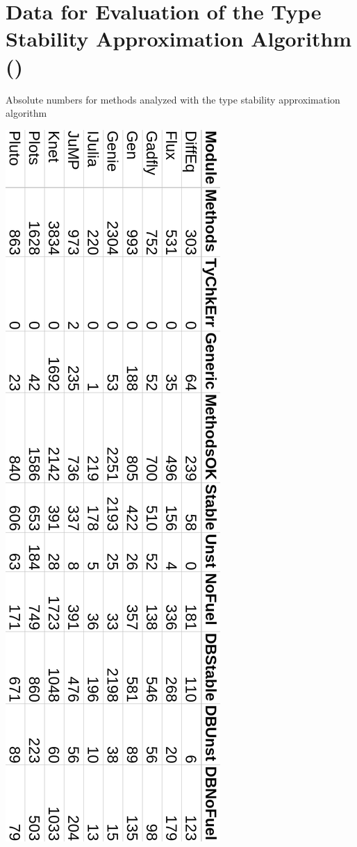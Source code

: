 \chapter[Data for Evaluation of the Type Stability Approximation Algorithm]{%
  Data for Evaluation of the Type Stability Approximation Algorithm ()}%
\label{app:approx}

\begin{table}%
\caption{Absolute numbers for methods analyzed with the type stability
  approximation algorithm}%
  \includegraphics[width=.56\textwidth]
  {figs/sts-eval/table-eval-abs-numbers-rot.png}
\end{table}


